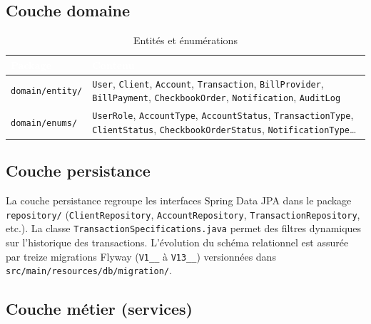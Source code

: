 \documentclass[11pt,a4paper,oneside]{report}
\newcommand{\tabhead}[1]{\textcolor{white}{\textbf{#1}}}
\begin{document}
\subsection{Couche domaine}

\begin{table}[H]
    \centering
    \caption{Entités et énumérations}
    \label{tab:domain}
    \small
    \begin{tabular}{@{}lp{9cm}@{}}
        \rowcolor{AmanaBrown}
        \tabhead{Package} & \tabhead{Contenu} \\
        \midrule
        \texttt{domain/entity/} & \texttt{User}, \texttt{Client}, \texttt{Account}, \texttt{Transaction}, \texttt{BillProvider}, \texttt{BillPayment}, \texttt{CheckbookOrder}, \texttt{Notification}, \texttt{AuditLog} \\
        \texttt{domain/enums/} & \texttt{UserRole}, \texttt{AccountType}, \texttt{AccountStatus}, \texttt{TransactionType}, \texttt{ClientStatus}, \texttt{CheckbookOrderStatus}, \texttt{NotificationType}… \\
        \bottomrule
    \end{tabular}
\end{table}

\subsection{Couche persistance}

La couche persistance regroupe les interfaces Spring Data JPA dans le package \texttt{repository/} (\texttt{ClientRepository}, \texttt{AccountRepository}, \texttt{TransactionRepository}, etc.). La classe \texttt{TransactionSpecifications.java} permet des filtres dynamiques sur l'historique des transactions. L'évolution du schéma relationnel est assurée par treize migrations Flyway (\texttt{V1\_\_} à \texttt{V13\_\_}) versionnées dans \texttt{src/main/resources/db/migration/}.

\subsection{Couche métier (services)}
\end{document}
